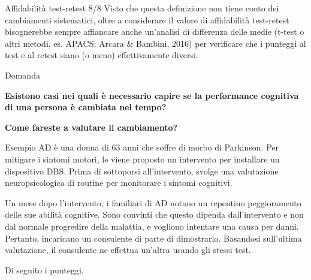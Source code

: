 \documentclass[
  ignorenonframetext,
  aspectratio=169,
]{beamer}
\begin{document}
\begin{frame}{Affidabilità test-retest 8/8}
\label{affidabilituxe0-test-retest-88}
Visto che questa definizione non tiene conto dei cambiamenti
sistematici, oltre a considerare il valore di affidabilità test-retest
bisognerebbe sempre affiancare anche un'analisi di differenza delle
medie (t-test o altri metodi, es. APACS; Arcara \& Bambini, 2016) per
verificare che i punteggi al test e al retest siano (o meno)
effettivamente diversi.
\end{frame}

\begin{frame}{Domanda}
\label{domanda}
\vfill
\begin{center}
{\LARGE\bfseries Esistono casi nei quali è necessario capire se la performance cognitiva di una persona è cambiata nel tempo?\par}
\vspace{1.2em}
{\LARGE\bfseries Come fareste a valutare il cambiamento?\par}
\end{center}
\vfill
\end{frame}

\begin{frame}{Esempio}
\label{esempio}
AD è una donna di 63 anni che soffre di morbo di Parkinson. Per mitigare
i sintomi motori, le viene proposto un intervento per installare un
dispositivo DBS. Prima di sottoporsi all'intervento, svolge una
valutazione neuropsicologica di routine per monitorare i sintomi
cognitivi.

Un mese dopo l'intervento, i familiari di AD notano un repentino
peggioramento delle sue abilità cognitive. Sono convinti che questo
dipenda dall'intervento e non dal normale progredire della malattia, e
vogliono intentare una causa per danni. Pertanto, incaricano un
consulente di parte di dimostrarlo. Basandosi sull'ultima valutazione,
il consulente ne effettua un'altra usando gli stessi test.

Di seguito i punteggi.
\end{frame}
\end{document}
